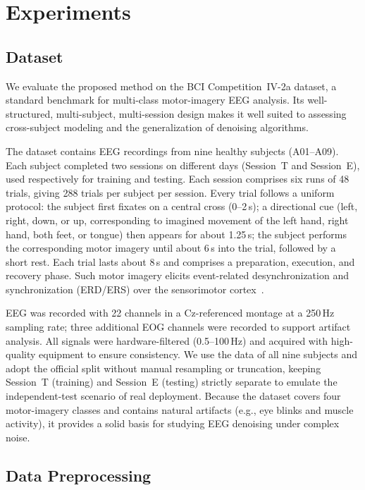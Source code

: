 \section{Experiments}
\label{sec:experiments}

\subsection{Dataset}
\label{sec:exp_data}

We evaluate the proposed method on the BCI Competition~IV-2a dataset, a standard
benchmark for multi-class motor-imagery EEG analysis. Its well-structured,
multi-subject, multi-session design makes it well suited to assessing
cross-subject modeling and the generalization of denoising algorithms.

The dataset contains EEG recordings from nine healthy subjects (A01--A09). Each
subject completed two sessions on different days (Session~T and Session~E), used
respectively for training and testing. Each session comprises six runs of 48
trials, giving 288 trials per subject per session. Every trial follows a uniform
protocol: the subject first fixates on a central cross (0--2\,s); a directional
cue (left, right, down, or up, corresponding to imagined movement of the left
hand, right hand, both feet, or tongue) then appears for about 1.25\,s; the
subject performs the corresponding motor imagery until about 6\,s into the
trial, followed by a short rest. Each trial lasts about 8\,s and comprises a
preparation, execution, and recovery phase. Such motor imagery elicits
event-related desynchronization and synchronization (ERD/ERS) over the
sensorimotor cortex~\cite{pfurtscheller1999erd}.

EEG was recorded with 22 channels in a Cz-referenced montage at a 250\,Hz
sampling rate; three additional EOG channels were recorded to support artifact
analysis. All signals were hardware-filtered (0.5--100\,Hz) and acquired with
high-quality equipment to ensure consistency. We use the data of all nine
subjects and adopt the official split without manual resampling or truncation,
keeping Session~T (training) and Session~E (testing) strictly separate to
emulate the independent-test scenario of real deployment. Because the dataset
covers four motor-imagery classes and contains natural artifacts (e.g., eye
blinks and muscle activity), it provides a solid basis for studying EEG
denoising under complex noise.

\subsection{Data Preprocessing}
\label{sec:exp_preprocess}

